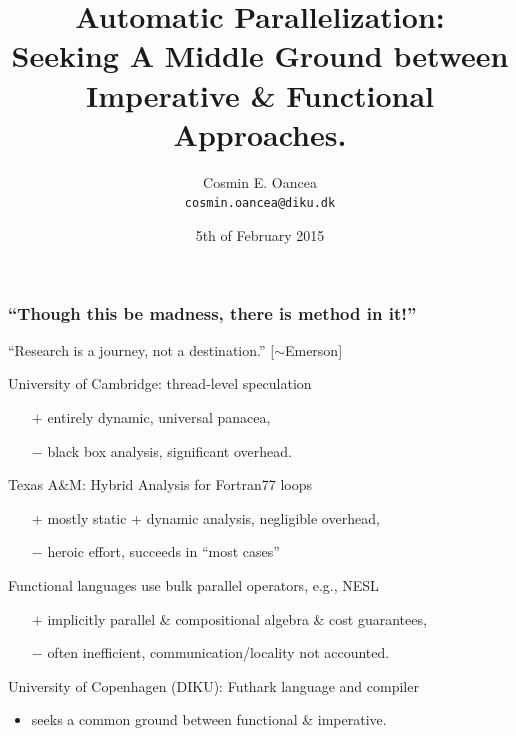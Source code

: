 \documentclass{beamer}
\title[]{Automatic Parallelization:\\ 
Seeking A Middle Ground between\\ 
Imperative \& Functional Approaches.}
\author[]{Cosmin E. Oancea\\{\tt cosmin.oancea@diku.dk}}
\institute{Department of Computer Science (DIKU)\\University of Copenhagen}
\date[05/02/2015]{5th of February 2015}
\renewcommand{\emph}[1]{\textcolor{structure}{#1}}
\newcommand{\emp}[1]{\textcolor{DikuRed}{ #1}}
\newcommand{\emphh}[1]{\textcolor{CosGreen}{ #1}}
\begin{document}
\titleslide


\begin{frame}\frametitle{``Though this be madness, there is method in it!''}

``Research is a journey, not a destination.'' [$\sim$Emerson]

\bigskip

University of Cambridge: thread-level speculation
\begin{itemize}
    \item[$+$] \emph{entirely dynamic,  universal panacea,}
    \item[$-$] \emp{ black box analysis, significant overhead.} 
\end{itemize}

\bigskip

Texas A\&M: Hybrid Analysis for Fortran77 loops
\begin{itemize}
    \item[$+$] \emph{mostly static + dynamic analysis, negligible overhead,}
    \item[$-$] \emp{ heroic effort, succeeds in ``most cases''}
\end{itemize}

\bigskip

Functional languages use bulk parallel operators, e.g., NESL
\begin{itemize}
    \item[$+$] \emph{implicitly parallel \& compositional algebra \& cost guarantees,}
    \item[$-$] \emp {often inefficient, communication/locality not accounted.}
\end{itemize}

\bigskip

University of Copenhagen (DIKU): Futhark language and compiler
\begin{itemize}
\item \emphh{seeks a common ground between functional \& imperative.}
\end{itemize}
%
\end{frame}

\begin{frame}[fragile]
	\tableofcontents
\end{frame}
\end{document}
